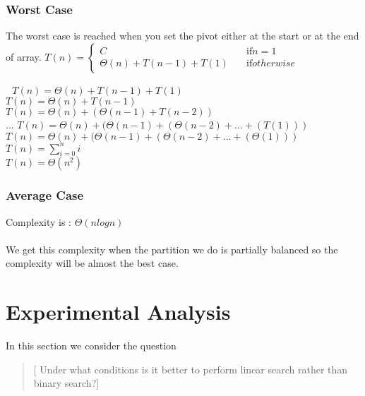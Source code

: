 \documentclass{article}
\begin{document}
\subsubsection{Worst Case}
The worst case is reached when you set the pivot either at the start or at the end of array.
\newline
$ T(n) =
  \begin{cases}
    C       & \quad \mathrm{if  } n =1\\

    \Theta(n) + T(n-1) +   T(1) & \quad \mathrm{if } otherwise
  \end{cases}
$

$ $
$ $
\newline
$T(n) = \Theta(n) + T(n-1) +   T(1) $\\
$T(n) = \Theta(n) + T(n-1)$\\
$T(n) = \Theta(n) + (\Theta(n - 1) + T(n-2))$\\
...
\newline
$T(n) = \Theta(n) + (\Theta(n - 1) + (\Theta(n - 2) + ... + (T(1)))$\\
$T(n) = \Theta(n) + (\Theta(n - 1) + (\Theta(n - 2) + ... + (\Theta(1)))$\\
$T(n) = {\sum\limits_{i=0}^n i}$\\
$T(n) = \Theta(n^2)$\\

\subsubsection{Average Case}

 Complexity is : $\Theta(nlogn)$ \\ \\
 We get this complexity when the partition we do is partially balanced so the complexity will be almost the best case.







\section{Experimental Analysis}
\label{sec:initialExperiments}

In this section we consider the question
	\begin{quote}
[	Under what conditions is it better to perform linear search rather than binary search?]
	\end{quote}
\end{document}

